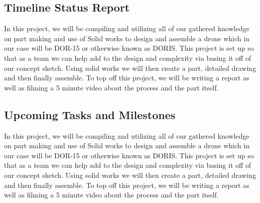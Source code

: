 
\subsection{Timeline Status Report}
In this project, we will be compiling and utilizing all of our gathered knowledge on part making and use of Solid works to design and assemble a drone which in our case will be DOR-15 or otherwise known as DORIS.  This project is set up so that as a team we can help add to the design and complexity via basing it off of our concept sketch.  Using solid works we will then create a part, detailed drawing and then finally assemble.  To top off this project, we will be writing a report as well as filming a 5 minute video about the process and the part itself.\par

\subsection{Upcoming Tasks and Milestones}
In this project, we will be compiling and utilizing all of our gathered knowledge on part making and use of Solid works to design and assemble a drone which in our case will be DOR-15 or otherwise known as DORIS.  This project is set up so that as a team we can help add to the design and complexity via basing it off of our concept sketch.  Using solid works we will then create a part, detailed drawing and then finally assemble. To top off this project, we will be writing a report as well as filming a 5 minute video about the process and the part itself.

